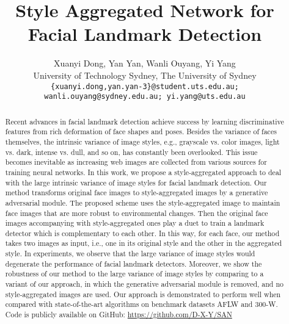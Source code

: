 \documentclass[10pt,twocolumn,letterpaper]{article}
\begin{document}
\title{Style Aggregated Network for Facial Landmark Detection}

\author{Xuanyi Dong, Yan Yan, Wanli Ouyang, Yi Yang \\
University of Technology Sydney,  The University of Sydney\\
{\tt\small \{xuanyi.dong,yan.yan-3\}@student.uts.edu.au;}\\
{\tt\small wanli.ouyang@sydney.edu.au; yi.yang@uts.edu.au}
}

\maketitle



\begin{abstract}

Recent advances in facial landmark detection achieve success by learning discriminative features from rich deformation of face shapes and poses.
Besides the variance of faces themselves, the intrinsic variance of image styles, e.g., grayscale vs. color images, light vs. dark, intense vs. dull, and so on, has constantly been overlooked.
This issue becomes inevitable as increasing web images are collected from various sources for training neural networks.
In this work, we propose a style-aggregated approach to deal with the large intrinsic variance of image styles for facial landmark detection.
Our method transforms original face images to style-aggregated images by a generative adversarial module.
The proposed scheme uses the style-aggregated image to maintain face images that are more robust to environmental changes.
Then the original face images accompanying with style-aggregated ones play a duet to train a landmark detector which is complementary to each other.
In this way, for each face, our method takes two images as input, i.e., one in its original style and the other in the aggregated style.
In experiments, we observe that the large variance of image styles would degenerate the performance of facial landmark detectors.
Moreover, we show the robustness of our method to the large variance of image styles by comparing to a variant of our approach, in which the generative adversarial module is removed, and no style-aggregated images are used.
Our approach is demonstrated to perform well when compared with state-of-the-art algorithms on benchmark datasets AFLW and 300-W.
Code is publicly available on GitHub: \url{https://github.com/D-X-Y/SAN}

\end{abstract}
\end{document}
